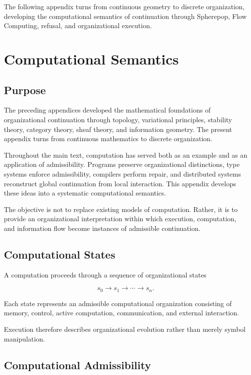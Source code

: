 \documentclass[11pt,oneside]{book}
\numberwithin{equation}{chapter}
\theoremstyle{definition}
\theoremstyle{plain}
\begin{document}
The following appendix turns from continuous geometry to discrete
organization, developing the computational semantics of continuation
through Spherepop, Flow Computing, refusal, and organizational execution.

\chapter{Computational Semantics}

\section{Purpose}

The preceding appendices developed the mathematical foundations of
organizational continuation through topology, variational principles,
stability theory, category theory, sheaf theory, and information
geometry. The present appendix turns from continuous mathematics to
discrete organization.

Throughout the main text, computation has served both as an example and
as an application of admissibility. Programs preserve organizational
distinctions, type systems enforce admissibility, compilers perform
repair, and distributed systems reconstruct global continuation from
local interaction. This appendix develops these ideas into a systematic
computational semantics.

The objective is not to replace existing models of computation. Rather,
it is to provide an organizational interpretation within which execution,
computation, and information flow become instances of admissible
continuation.

\section{Computational States}

A computation proceeds through a sequence of organizational states

\[
s_0
\rightarrow
s_1
\rightarrow
\cdots
\rightarrow
s_n.
\]

Each state represents an admissible computational organization consisting
of memory, control, active computation, communication, and external
interaction.

Execution therefore describes organizational evolution rather than
merely symbol manipulation.

\section{Computational Admissibility}
\end{document}
